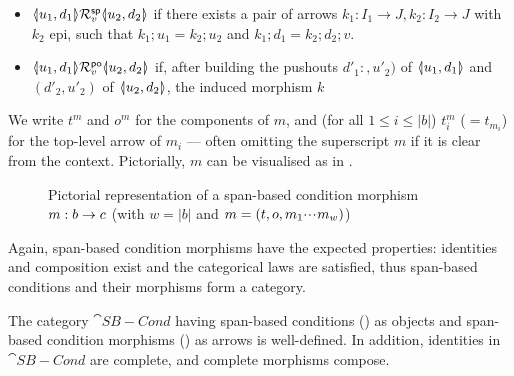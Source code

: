 \begin{itemize}
\item $\spanof{u_1}{d_1}\cRsp_v\spanof{u_2}{d_2}$ if there exists a pair of arrows $k_1:I_1\to J,k_2:I_2\to J$ with $k_2$ epi, such that $k_1;u_1=k_2;u_2$ and $k_1;d_1=k_2;d_2;v$.

\item $\spanof{u_1}{d_1}\cRpo_v \spanof{u_2}{d_2}$ if, after building the pushouts $d'_1:,u'_2)$ of $\spanof{u_1}{d_1}$ and $(d'_2,u'_2)$ of $\spanof{u_2}{d_2}$, the induced morphism $k$
\end{itemize}
%
\begin{center}

\end{center}
%
We write $t^m$ and $o^m$ for the components of $m$, and (for all $1\leq i\leq |b|$) $t^m_i$ ($=t_{m_i}$) for the top-level arrow of $m_i$ --- often omitting the superscript $m$ if it is clear from the context. Pictorially, $m$ can be visualised as in .
%
\begin{figure}
  \centering
  
  \caption{Pictorial representation of a span-based condition morphism $m:b\rightarrow c$ (with $w=|b|$ and $m=(t,o,m_1{\cdotp\mkern-2mu\cdotp\mkern-2mu\cdotp\mkern1mu} m_w)$)}
\end{figure}
%

\medskip\noindent Again, span-based condition morphisms have the expected properties: identities and composition exist and the categorical laws are satisfied, thus span-based conditions and their morphisms form a category.

\begin{proposition}
  The category $\cat{SB-Cond}$ having span-based conditions () as objects and span-based condition morphisms () as arrows is well-defined. In addition, identities in $\cat{SB-Cond}$ are complete, and complete morphisms compose.
\end{proposition}
 
